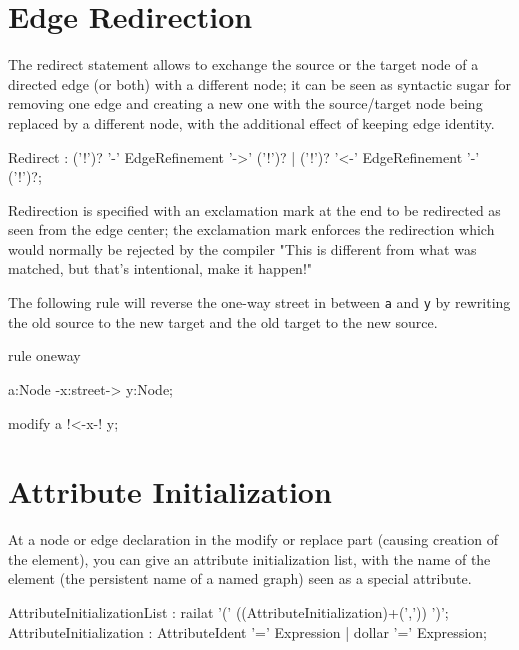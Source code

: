 \section{Edge Redirection} \label{sec:redirect}

The redirect statement allows to exchange the source or the target node of a directed edge (or both) with a different node;
it can be seen as syntactic sugar for removing one edge and creating a new one with the source/target node being replaced by a different node, with the additional effect of keeping edge identity.

\begin{rail}
Redirect : ('!')? '-' EdgeRefinement '->' ('!')? | ('!')? '<-' EdgeRefinement '-' ('!')?;
\end{rail}

Redirection is specified with an exclamation mark at the end to be redirected as seen from the edge center;
the exclamation mark enforces the redirection which would normally be rejected by the compiler "This is different from what was matched, but that's intentional, make it happen!"

\begin{example}
The following rule will reverse the one-way street in between \texttt{a} and \texttt{y} by rewriting the old source to the new target and the old target to the new source.
\begin{grgen}
rule oneway {
  a:Node -x:street-> y:Node;

  modify {
    a !<-x-! y;
  }
}
\end{grgen}
\end{example}


\section{Attribute Initialization} \label{sec:attribinitrule}

At a node or edge declaration in the modify or replace part (causing creation of the element), you can give an attribute initialization list, with the name of the element (the persistent name of a named graph) seen as a special attribute.

\begin{rail}
AttributeInitializationList : railat '(' ((AttributeInitialization)+(',')) ')';
AttributeInitialization : AttributeIdent '=' Expression | dollar '=' Expression;
\end{rail}

